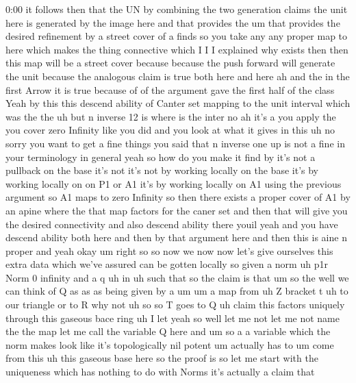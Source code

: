\begin{unfinished}{0:00}
it  follows  then  that  the  UN  by  combining
the  two  generation  claims  the  unit  here
is  generated  by  the  image  here  and  that
provides  the  um  that  provides  the
desired  refinement  by  a  street  cover  of
a  finds  so  you  take  any  any  proper  map
to  here  which  makes  the  thing  connective
which  I  I  I  explained  why  exists  then
then  this  map  will  be  a  street  cover
because  because  the  push  forward  will
generate  the  unit  because  the  analogous
claim  is  true  both  here  and  here  ah  and
the  in  the  first  Arrow  it  is  true
because  of  of  the  argument  gave  the
first  half  of  the  class  Yeah  by  this
this  descend  ability  of  Canter  set
mapping  to  the  unit
interval
which  was  the
the  uh  but  n  inverse  12
is  where  is  the  inter  no  ah  it's
a  you  apply  the  you  cover  zero  Infinity
like  you  did  and  you  look  at  what  it
gives  in  this
uh
no  sorry  you  want  to  get  a  fine  things
you  said  that  n  inverse  one  up  is  not  a
fine  in  your  terminology  in  general  yeah
so  how  do  you  make  it  find  by  it's  not  a
pullback  on  the  base  it's  not  it's  not
by  working  locally  on  the  base  it's  by
working  locally  on  on  P1  or  A1  it's  by
working  locally  on  A1  using  the  previous
argument  so  A1  maps  to  zero  Infinity  so
then  there  exists  a  proper  cover  of  A1
by  an  apine  where  the  that  map  factors
for  the  caner
set  and  then  that  will  give  you  the
desired  connectivity  and  also  descend
ability  there
youil  yeah  and  you  have  descend  ability
both  here  and  then  by  that  argument  here
and  then  this  is  aine  n  proper
and
yeah  okay
um  right  so  so  now  we  now  now  let's  give
ourselves  this  extra  data  which  we've
assured  can  be  gotten  locally  so  given  a
norm  uh  p1r  Norm  0  infinity  and  a  q  uh
in  uh  such
that
so  the
claim  is  that
um  so  the  well  we  can  think  of  Q  as  as
as  being  given  by  a  um  um  a  map
from
uh  Z  bracket  t  uh  to  our
triangle  or  to  R  why  not  uh  so  so  T  goes
to
Q  uh  claim  this  factors
uniquely  through  this  gaseous  bace  ring
uh  I  let  yeah  so
well  let  me  not  let  me  not  name  the  the
map  let  me  call  the  variable  Q  here  and
um  so  a
a  variable  which  the  norm  makes  look
like  it's  topologically  nil
potent  um  actually  has  to
um  come  from  this  uh  this  gaseous  base
here  so  the  proof  is  so  let  me  start
with  the  uniqueness  which  has  nothing  to
do  with  Norms  it's  actually  a  claim  that

\end{unfinished}

